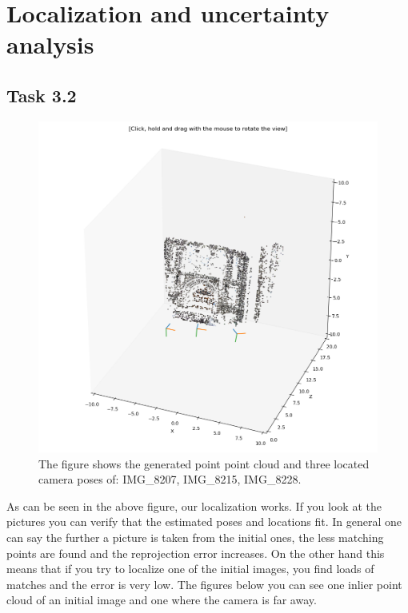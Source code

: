 \documentclass[a4paper]{article} %
\begin{document}
\section{Localization and uncertainty analysis}
    \subsection*{Task 3.2}
    \begin{figure}[H]
        \center
        \includegraphics[width= 0.7 \linewidth]{cam_pos}
        \caption{The figure shows the generated point point cloud and three located camera poses of: IMG\_8207, IMG\_8215, IMG\_8228.}
    \end{figure}
    As can be seen in the above figure, our localization works.
    If you look at the pictures you can verify that the estimated poses and locations fit.
    In general one can say the further a picture is taken from the initial ones, the less matching points are found and the reprojection error increases.
    On the other hand this means that if you try to localize one of the initial images, you find loads of matches and the error is very low.
    The figures below you can see one inlier point cloud of an initial image and one where the camera is far away.
\end{document}
